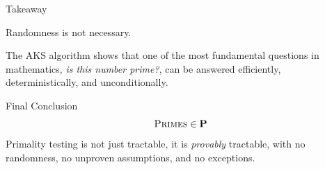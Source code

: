 \documentclass{beamer}
\begin{document}

\begin{frame}{Takeaway}
\begin{center}
\Large
Randomness is not necessary.
\end{center}
\vspace{1.5em}

The AKS algorithm shows that one of the most fundamental questions
in mathematics, \emph{is this number prime?}, can be answered
efficiently, deterministically, and unconditionally.

\begin{block}{Final Conclusion}
\[
    \textsc{Primes} \in \mathbf{P}
\]
Primality testing is not just tractable, it is \emph{provably} tractable,
with no randomness, no unproven assumptions, and no exceptions.
\end{block}
\end{frame}
\end{document}
